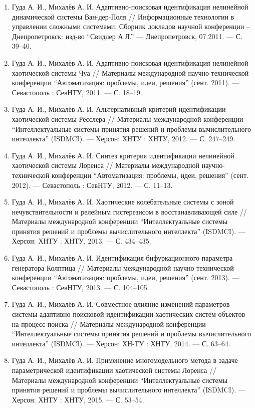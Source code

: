 \begin{enumerate}
\item
Гуда А. И., Михалёв А. И. Адаптивно-поисковая идентификация нелинейной динамической
системы Ван-дер-Поля // Информационные технологии в управлении сложными системами.
Сборник докладов научной конференции – Днепропетровск:
изд-во ``Свидлер А.Л.'' --- Днепропетровск, 07.2011. --- С. 39--40.

\item
Гуда А. И., Михалёв А. И. Адаптивно-поисковая идентификация нелинейной хаотической
системы Чуа // Материалы международной научно-технической конференции
``Автоматизация: проблемы, идеи, решения'' (сент. 2011). --- Севастополь : СевНТУ,
2011. --- С. 18--19.

\item
Гуда А. И., Михалёв А. И. Альтернативный критерий идентификации хаотической системы Рёсслера
// Материалы международной конференции ``Интеллектуальные системы принятия решений
и проблемы вычислительного интеллекта'' (ISDMCI). ---
Херсон: ХНТУ : ХНТУ, 2012. --- С. 247--249.

\item
Гуда А. И., Михалёв А. И. Синтез критерия идентификации нелинейной хаотической
системы Лоренса // Материалы международной научно-технической конференции
``Автоматизация: проблемы, идеи, решения'' (сент. 2012). --- Севастополь : СевНТУ,
2012. --- С. 11--13.

\item
Гуда А. И., Михалёв А. И. Хаотические колебательные системы с зоной нечувствительности
и релейным гистерезисом в восстанавливающей силе // Материалы международной конференции
``Интеллектуальные системы принятия решений и проблемы
вычислительного интеллекта'' (ISDMCI). --- Херсон: ХНТУ : ХНТУ, 2013. --- С. 434--435.

\item
Гуда А. И., Михалёв А. И. Идентификация бифуркационного параметра генератора
Колптица // Материалы международной научно-технической конференции
``Автоматизация: проблемы, идеи, решения'' (сент. 2013). --- Севастополь : СевНТУ, 2013. ---
С. 104--105.

\item
Гуда А. И., Михалёв А. И. Совместное влияние изменений параметров системы
адаптивно-поисковой идентификации хаотических систем объектов на процесс поиска
// Материалы международной конференции ``Интеллектуальные системы принятия
решений и проблемы вычислительного интеллекта'' (ISDMCI). --- Херсон: ХН-ТУ : ХНТУ, 2014. --- С. 63--64.

\item
Гуда А. И., Михалёв А. И. Применение многомодельного метода в задаче параметрической
идентификации хаотической системы Лоренса // Материалы международной
конференции ``Интеллектуальные системы принятия решений и проблемы вычислительного интеллекта''
(ISDMCI). --- Херсон: ХНТУ : ХНТУ, 2015. --- С. 53--54.


\end{enumerate}
